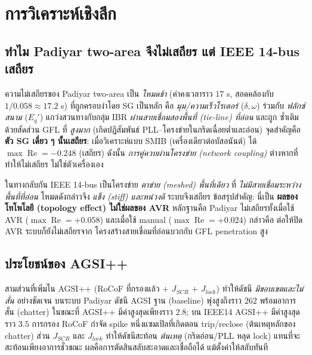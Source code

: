 \documentclass[12pt,a4paper]{article}
\newcommand{\re}{\operatorname{Re}}
\begin{document}
\section{การวิเคราะห์เชิงลึก}
\label{sec:F}
\subsection{ทำไม Padiyar two-area จึงไม่เสถียร แต่ IEEE 14-bus เสถียร}
ความไม่เสถียรของ Padiyar two-area เป็น \emph{โหมดช้า} (ค่าคงเวลาราว $17$ s, สอดคล้องกับ
$1/0.058\approx17.2$ s) ที่ถูกครอบงำโดย SG เป็นหลัก คือ \emph{มุม/ความเร็วโรเตอร์} ($\delta,\omega$) ร่วมกับ
\emph{ฟลักซ์สนาม} ($E_q'$) แกว่งสวนทางกับกลุ่ม IBR \emph{ผ่านสายเชื่อมสองพื้นที่ (tie-line) ที่อ่อน} และถูก
ซ้ำเติมด้วยสัดส่วน GFL ที่ \emph{สูงมาก} (เกิดปฏิสัมพันธ์ PLL--โครงข่ายในกริดเฉื่อยต่ำและอ่อน) จุดสำคัญคือ
\textbf{ตัว SG เดี่ยว ๆ นั้นเสถียร}: เมื่อวิเคราะห์แบบ SMIB (เครื่องเดียวต่อบัสอนันต์) ได้ $\max\re=-0.248$
(เสถียร) ดังนั้น \emph{การคู่ควบผ่านโครงข่าย (network coupling)} ต่างหากที่ทำให้ไม่เสถียร ไม่ใช่ตัวเครื่องเอง

ในทางกลับกัน IEEE 14-bus เป็นโครงข่าย \emph{ตาข่าย (meshed) พื้นที่เดียว} ที่ \emph{ไม่มีสายเชื่อมระหว่าง
พื้นที่ที่อ่อน} โหมดดังกล่าวจึง \emph{แข็ง (stiff) และหน่วงดี} ระบบจึงเสถียร ข้อสรุปสำคัญ: นี่เป็น
\textbf{ผลของโทโพโลยี (topology effect) ไม่ใช่ผลของ AVR} หลักฐานคือ Padiyar ไม่เสถียรทั้งเมื่อใช้ AVR
($\max\re=+0.058$) และเมื่อใช้ manual ($\max\re=+0.024$) กล่าวคือ ต่อให้ปิด AVR ระบบก็ยังไม่เสถียรจาก
โครงสร้างสายเชื่อมที่อ่อนบวกกับ GFL penetration สูง

\subsection{ประโยชน์ของ AGSI++}
สามส่วนที่เพิ่มใน AGSI++ (RoCoF ที่กรองแล้ว + $J_{SCR}$ + $J_{lock}$) ทำให้ดัชนี \emph{มีขอบเขตและไม่สั่น}
อย่างชัดเจน บนระบบ Padiyar ดัชนี AGSI ฐาน (baseline) พุ่งสูงถึงราว $262$ พร้อมอาการสั่น (chatter) ในขณะที่
AGSI++ มีค่าสูงสุดเพียงราว $2.8$; บน IEEE14 AGSI++ มีค่าสูงสุดราว $3.5$ การกรอง RoCoF กำจัด spike
หนึ่งแซมเปิลที่เกิดตอน trip/reclose (ต้นเหตุหลักของ chatter) ส่วน $J_{SCR}$ และ $J_{lock}$ ทำให้ดัชนีสะท้อน
\emph{ต้นเหตุ} (กริดอ่อน/PLL หลุด lock) แทนที่จะสะท้อนเพียงอาการชั่วขณะ ผลคือการตัดสินสลับสะอาดและเชื่อถือได้
แม้ตั้งค่าให้สลับทันที
\end{document}
